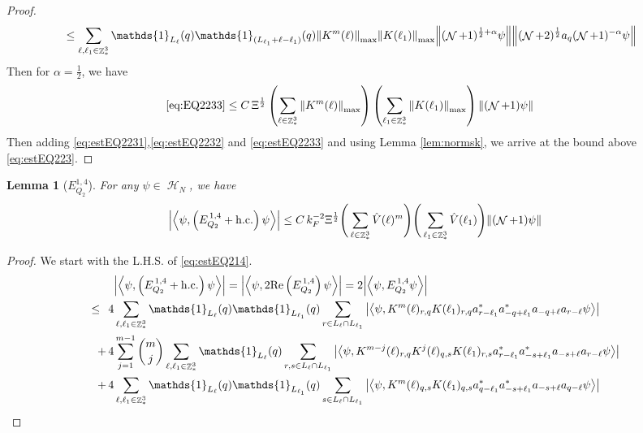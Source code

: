\documentclass[sn-mathphys, Numbered ,a4paper]{sn-jnl}%
\DeclareMathOperator{\Z}{\mathbb{Z}}
\DeclareMathOperator{\HH}{\mathcal{H}}
\DeclareMathOperator{\NN}{\mathcal{N}}
\newcommand{\half}{\frac{1}{2}}
\newcommand{\eva}[1]{\left\langle #1 \right\rangle}
\theoremstyle{plain}
\newtheorem{lemma}[theorem]{Lemma}
\theoremstyle{definition}
\theoremstyle{remark}
\theoremstyle{plain}
\theoremstyle{definition}
\theoremstyle{remark}
\begin{document}
{\begin{proof}
\begin{align}
		&\leq \sum\limits_{\ell, \ell_1\in \Z^3_*} \mathds{1}_{L_{\ell}}(q) \mathds{1}_{(L_{\ell_1}+\ell-\ell_1)}(q) \norm{K^m{(\ell)}}_{\mathrm{max}} \norm{K(\ell_1)}_{\mathrm{max}} \norm{ (\NN+1)^{\half+\alpha}\psi} \norm{  (\NN+2)^\half  a_{q} (\NN+1)^{-\alpha} \psi } \nonumber
	\end{align} 
	Then for $\alpha = \half$, we have
	\begin{align}
		\eqref{eq:EQ2233}&\leq C\, \Xi^\half \left(\sum\limits_{\ell\in \Z^3_*} \norm{K^m(\ell)}_{\mathrm{max}}\right)\left(  \sum\limits_{ \ell_1\in \Z^3_*}  \norm{ K(\ell_1)}_{\mathrm{max}} \right) \norm{ (\NN+1) \psi}\label{eq:estEQ2233} 
	\end{align}
	Then adding \eqref{eq:estEQ2231},\eqref{eq:estEQ2232} and \eqref{eq:estEQ2233} and using Lemma \ref{lem:normsk}, we arrive at the bound above \eqref{eq:estEQ223}. 
\end{proof}
\begin{lemma}[$E_{Q_2}^{1,4}$]\label{lem:EQ214}
	For any $\psi \in \HH_N$, we have
	\begin{align}
		\abs{\eva{\psi,\left(E^{\,1,4}_{Q_2}+\mathrm{h.c.}\right) \psi }}
	\leq  C\, k_{F}^{-2} \Xi^{\half} \Bigg(\sum\limits_{\ell \in \Z^3_*} \hat{V}(\ell)^m \Bigg) \Bigg( \sum\limits_{\ell_1 \in \Z^3_*}\hat{V}(\ell_1) \Bigg)  \norm { (\NN+1) \psi } \label{eq:estEQ214}
	\end{align}
\end{lemma}
\begin{proof}
	We start with the L.H.S. of \eqref{eq:estEQ214}.
	\begin{align}
		&\abs{\eva{\psi,\left(E^{\,1,4}_{Q_2}+\mathrm{h.c.}\right) \psi }} = \abs{\eva{\psi,2\mathrm{Re}\left(E^{\,1,4}_{Q_2}\right) \psi }} = 2\abs{\eva{\psi, E^{\,1,4}_{Q_2} \psi }}\nonumber\\
		\leq\,\;4& \sum\limits_{\ell, \ell_1\in \Z^3_*} \mathds{1}_{L_{\ell}}(q) \mathds{1}_{L_{\ell_1}}(q) \sum\limits_{r\in L_{\ell} \cap L_{\ell_1}} \abs{\eva{\psi,  K^m(\ell)_{r,q}K(\ell_1)_{r,q}a^*_{r-\ell_1}a^*_{-q+\ell_1} a_{-q+\ell}a_{r-\ell} \psi }}\label{eq:EQ2141}\\
		+\,4& \sum\limits_{j=1}^{m-1} {{m}\choose j} \sum\limits_{\ell, \ell_1\in \Z^3_*}\mathds{1}_{L_{\ell}}(q) \sum\limits_{r,s \in L_{\ell} \cap L_{\ell_1}}  \abs{\eva{\psi, K^{m-j}(\ell)_{r,q} K^{j}(\ell)_{q,s} K(\ell_1)_{r,s} a^*_{r-\ell_1} a^*_{-s+\ell_1} a_{-s+\ell} a_{r-\ell} \psi }} \label{eq:EQ2142}\\
		+\,4&\sum\limits_{\ell, \ell_1\in \Z^3_*} \mathds{1}_{L_{\ell}}(q) \mathds{1}_{L_{\ell_1}}(q) \sum\limits_{s \in L_{\ell} \cap L_{\ell_1}} \abs{\eva{\psi,  K^m(\ell)_{q,s}K(\ell_1)_{q,s}a^*_{q-\ell_1}a^*_{-s+\ell_1} a_{-s+\ell}a_{q-\ell} \psi }}\label{eq:EQ2143}

\end{align}
\end{proof}}
\end{document}
